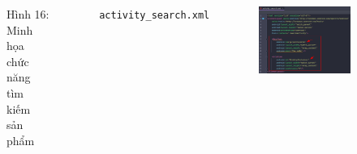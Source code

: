 \documentclass{beamer}
\begin{document}
\begin{frame}
\begin{columns}
\begin{figure}
            \caption{\centering\tiny{Hình 16: Minh họa chức năng tìm kiếm sản phẩm}}
        \end{figure}
        \indent \texttt{activity\_search.xml}
        \begin{figure}
            \centering
            \includegraphics[width=\textwidth]{images/44.png}
        \end{figure}
    \end{columns}
\end{frame}
\end{document}
